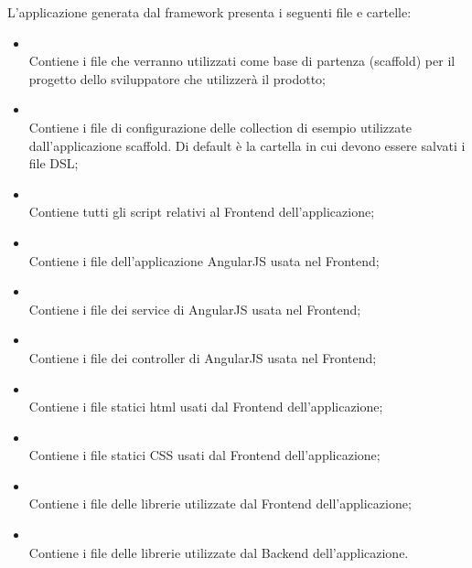 L'applicazione generata dal framework presenta i seguenti file e cartelle: 
\begin{itemize}
 \item \textbf{} \\
	Contiene i file che verranno utilizzati come base di partenza (scaffold) per il progetto dello sviluppatore che utilizzerà il prodotto;

 \item \textbf{} \\
	Contiene i file di configurazione delle collection di esempio utilizzate dall'applicazione scaffold. Di default è la cartella in cui devono essere salvati i file DSL;

 \item \textbf{} \\
	Contiene tutti gli script relativi al Frontend dell'applicazione;

 \item \textbf{} \\
	Contiene i file dell'applicazione AngularJS usata nel Frontend;

 \item \textbf{} \\
	Contiene i file dei service di AngularJS usata nel Frontend;

 \item \textbf{} \\
	Contiene i file dei controller di AngularJS usata nel Frontend;

 \item \textbf{} \\
	Contiene i file statici html usati dal Frontend dell'applicazione;

 \item \textbf{} \\
	Contiene i file statici CSS usati dal Frontend dell'applicazione;

 \item \textbf{} \\
	Contiene i file delle librerie utilizzate dal Frontend dell'applicazione;
	
 \item \textbf{} \\
	Contiene i file delle librerie utilizzate dal Backend dell'applicazione.
\end{itemize}
